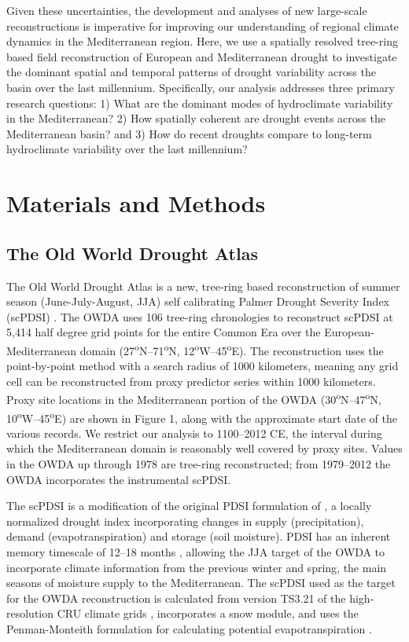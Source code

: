 \documentclass[draft,jgr]{AGUTeX}
\begin{document}
\begin{article}
\indent Given these uncertainties, the development and analyses of new large-scale reconstructions is imperative for improving our understanding of regional climate dynamics in the Mediterranean region. Here, we use a spatially resolved tree-ring based field reconstruction of European and Mediterranean drought to investigate the dominant spatial and temporal patterns of drought variability across the basin over the last millennium. Specifically, our analysis addresses three primary research questions: 1) What are the dominant modes of hydroclimate variability in the Mediterranean? 2) How spatially coherent are drought events across the Mediterranean basin? and 3) How do recent droughts compare to long-term hydroclimate variability over the last millennium?

\section{Materials and Methods}
\subsection{The Old World Drought Atlas}
\noindent The Old World Drought Atlas \citep[OWDA;][]{CookOWDA2015} is a new, tree-ring based reconstruction of summer season (June-July-August, JJA) self calibrating Palmer Drought Severity Index (scPDSI) \citep{Schrier2013}. The OWDA uses 106 tree-ring chronologies to reconstruct scPDSI at 5,414 half degree grid points for the entire Common Era over the European-Mediterranean domain (27\textsuperscript{o}N--71\textsuperscript{o}N, 12\textsuperscript{o}W--45\textsuperscript{o}E). The reconstruction uses the point-by-point method \citep{Cook1999,CookER2013} with a search radius of 1000 kilometers, meaning any grid cell can be reconstructed from proxy predictor series within 1000 kilometers. Proxy site locations in the Mediterranean portion of the OWDA (30\textsuperscript{o}N--47\textsuperscript{o}N, 10\textsuperscript{o}W--45\textsuperscript{o}E) are shown in Figure 1, along with the approximate start date of the various records. We restrict our analysis to 1100--2012 CE, the interval during which the Mediterranean domain is reasonably well covered by proxy sites. Values in the OWDA up through 1978 are tree-ring reconstructed; from 1979--2012 the OWDA incorporates the instrumental scPDSI. 

\indent  The scPDSI is a modification of the original PDSI formulation of \cite{Palmer1965}, a locally normalized drought index incorporating changes in supply (precipitation), demand (evapotranspiration) and storage (soil moisture). PDSI has an inherent memory timescale of 12--18 months \citep{Guttman1998,Vicente2010}, allowing the JJA target of the OWDA to incorporate climate information from the previous winter and spring, the main seasons of moisture supply to the Mediterranean. The scPDSI used as the target for the OWDA reconstruction is calculated from version TS3.21 of the high-resolution CRU climate grids \citep{Harris2014}, incorporates a snow module, and uses the Penman-Monteith formulation for calculating potential evapotranspiration \citep{Schrier2013}.


\end{article}
\end{document}
